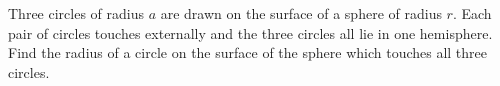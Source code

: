 Three circles of radius $a$ are drawn on the surface of a sphere of radius $r$. Each pair of circles touches externally and the three circles all lie in one hemisphere. Find the radius of a circle on the surface of the sphere which touches all three circles.